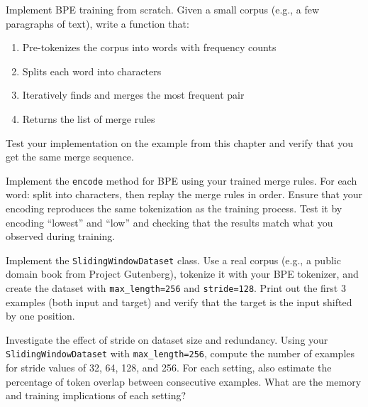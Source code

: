 \begin{problem}[2]
  Implement BPE training from scratch. Given a small corpus (e.g., a few
  paragraphs of text), write a function that:
  \begin{enumerate}
    \item Pre-tokenizes the corpus into words with frequency counts
    \item Splits each word into characters
    \item Iteratively finds and merges the most frequent pair
    \item Returns the list of merge rules
  \end{enumerate}
  Test your implementation on the example from this chapter and verify
  that you get the same merge sequence.
\end{problem}

\begin{problem}[3]
  Implement the \texttt{encode} method for BPE using your trained merge
  rules. For each word: split into characters, then replay the merge
  rules in order. Ensure that your encoding reproduces the same
  tokenization as the training process. Test it by encoding ``lowest''
  and ``low'' and checking that the results match what you observed
  during training.
\end{problem}

\begin{problem}[4]
  Implement the \texttt{SlidingWindowDataset} class. Use a real
  corpus (e.g., a public domain book from Project Gutenberg), tokenize
  it with your BPE tokenizer, and create the dataset with
  \texttt{max\_length=256} and \texttt{stride=128}. Print out the first
  3 examples (both input and target) and verify that the target is the
  input shifted by one position.
\end{problem}

\begin{problem}[5]
  Investigate the effect of stride on dataset size and redundancy. Using
  your \texttt{SlidingWindowDataset} with \texttt{max\_length=256},
  compute the number of examples for stride values of 32, 64, 128, and
  256. For each setting, also estimate the percentage of token overlap
  between consecutive examples. What are the memory and training
  implications of each setting?
\end{problem}